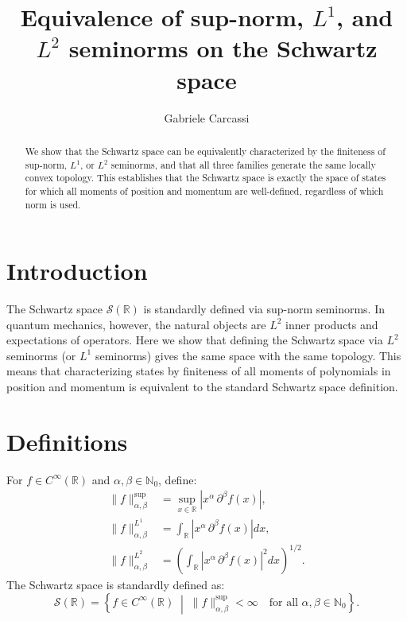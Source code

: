 \documentclass{techbrief}
\title{Equivalence of sup-norm, $L^1$, and $L^2$ seminorms on the Schwartz space}
\author{Gabriele Carcassi}
\begin{document}
	
	\maketitle
	
	\begin{abstract}
		We show that the Schwartz space can be equivalently characterized by the finiteness of sup-norm, $L^1$, or $L^2$ seminorms, and that all three families generate the same locally convex topology. This establishes that the Schwartz space is exactly the space of states for which all moments of position and momentum are well-defined, regardless of which norm is used.
	\end{abstract}
	
	\section{Introduction}
	
	The Schwartz space $\mathcal{S}(\mathbb{R})$ is standardly defined via sup-norm seminorms. In quantum mechanics, however, the natural objects are $L^2$ inner products and expectations of operators. Here we show that defining the Schwartz space via $L^2$ seminorms (or $L^1$ seminorms) gives the same space with the same topology. This means that characterizing states by finiteness of all moments of polynomials in position and momentum is equivalent to the standard Schwartz space definition.
	
	\section{Definitions}
	
	For $f \in C^\infty(\mathbb{R})$ and $\alpha, \beta \in \mathbb{N}_0$, define:
	\begin{align}
		\|f\|_{\alpha,\beta}^{\sup} &= \sup_{x \in \mathbb{R}} \left| x^\alpha \, \partial^\beta f(x) \right|, \\[6pt]
		\|f\|_{\alpha,\beta}^{L^1} &= \int_{\mathbb{R}} \left| x^\alpha \, \partial^\beta f(x) \right| dx, \\[6pt]
		\|f\|_{\alpha,\beta}^{L^2} &= \left( \int_{\mathbb{R}} \left| x^\alpha \, \partial^\beta f(x) \right|^2 dx \right)^{1/2}.
	\end{align}
	The Schwartz space is standardly defined as:
	\begin{equation}
		\mathcal{S}(\mathbb{R}) = \left\{ f \in C^\infty(\mathbb{R}) \;\middle|\; \|f\|_{\alpha,\beta}^{\sup} < \infty \quad \text{for all } \alpha, \beta \in \mathbb{N}_0 \right\}.
	\end{equation}
	
\end{document}

